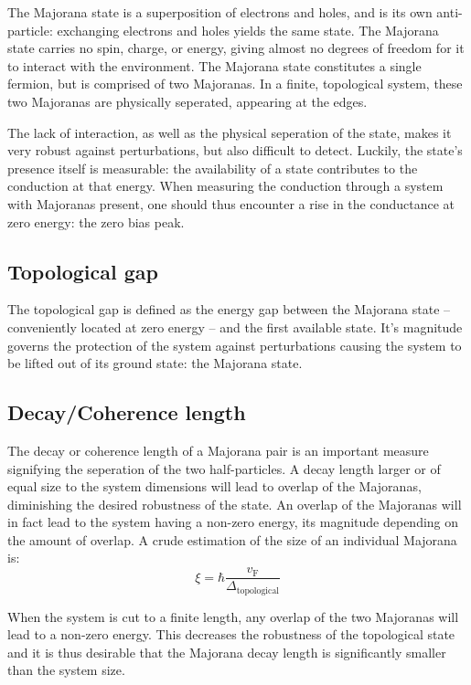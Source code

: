 		The Majorana state is a superposition of electrons and holes, and is its own anti-particle: exchanging electrons and holes yields the same state.
		The Majorana state carries no spin, charge, or energy, giving almost no degrees of freedom for it to interact with the environment.
		The Majorana state constitutes a single fermion, but is comprised of two Majoranas.
		In a finite, topological system, these two Majoranas are physically seperated, appearing at the edges.

		The lack of interaction, as well as the physical seperation of the state, makes it very robust against perturbations, but also difficult to detect.
		Luckily, the state's presence itself is measurable: the availability of a state contributes to the conduction at that energy.
		When measuring the conduction through a system with Majoranas present, one should thus encounter a rise in the conductance at zero energy: the zero bias peak.

	\subsection{Topological gap}
		The topological gap is defined as the energy gap between the Majorana state -- conveniently located at zero energy -- and the first available state.
		It's magnitude governs the protection of the system against perturbations causing the system to be lifted out of its ground state: the Majorana state.

	\subsection{Decay/Coherence length}
		The decay or coherence length of a Majorana pair is an important measure signifying the seperation of the two half-particles.
		A decay length larger or of equal size to the system dimensions will lead to overlap of the Majoranas, diminishing the desired robustness of the state.
		An overlap of the Majoranas will in fact lead to the system having a non-zero energy, its magnitude depending on the amount of overlap.
		A crude estimation of the size of an individual Majorana is:
		\begin{equation}
			\xi = \hbar \frac{v_\text{F}}{\Delta_\text{topological}}
			\label{eq:majorana_coherence_length}
		\end{equation}

		When the system is cut to a finite length, any overlap of the two Majoranas will lead to a non-zero energy.
		This decreases the robustness of the topological state and it is thus desirable that the Majorana decay length is significantly smaller than the system size.

